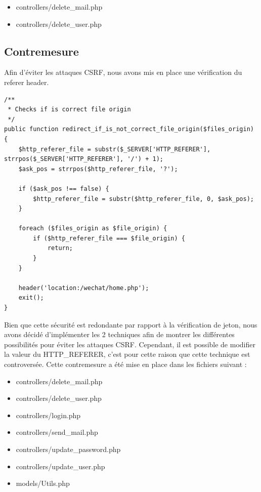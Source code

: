 \documentclass[12pt]{article}
\begin{document}
\begin{itemize}
\item controllers/delete\_mail.php
\item controllers/delete\_user.php
\end{itemize}

\newpage
\subsection{Contremesure}\label{c4_2}

Afin d'éviter les attaques CSRF, nous avons mis en place une vérification du referer header. 

\begin{lstlisting}[style=JAVA]
/**
 * Checks if is correct file origin
 */
public function redirect_if_is_not_correct_file_origin($files_origin) {
    $http_referer_file = substr($_SERVER['HTTP_REFERER'], strrpos($_SERVER['HTTP_REFERER'], '/') + 1);
    $ask_pos = strrpos($http_referer_file, '?');

    if ($ask_pos !== false) {
        $http_referer_file = substr($http_referer_file, 0, $ask_pos);
    }
    
    foreach ($files_origin as $file_origin) {
        if ($http_referer_file === $file_origin) {
            return;
        }
    }

    header('location:/wechat/home.php');
    exit();
}
\end{lstlisting}

Bien que cette sécurité est redondante par rapport à la vérification de jeton, nous avons décidé d'implémenter les 2 techniques afin de montrer les différentes possibilités pour éviter les attaques CSRF. Cependant, il est possible de modifier la valeur du HTTP\_REFERER, c'est pour cette raison que cette technique est controversée.
Cette contremesure a été mise en place dans les fichiers suivant :

\begin{itemize}
\item controllers/delete\_mail.php
\item controllers/delete\_user.php
\item controllers/login.php
\item controllers/send\_mail.php
\item controllers/update\_password.php
\item controllers/update\_user.php
\item models/Utils.php
\end{itemize}
\end{document}
